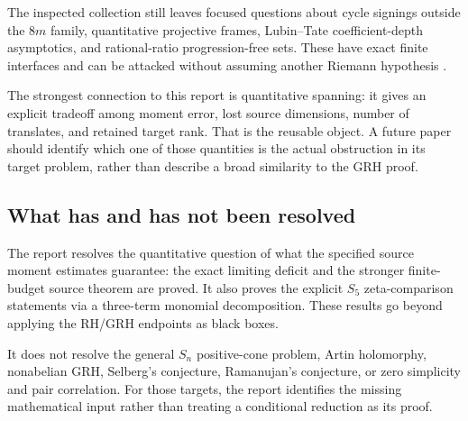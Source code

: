 The inspected collection still leaves focused questions about cycle
signings outside the $8m$ family, quantitative projective frames,
Lubin--Tate coefficient-depth asymptotics, and rational-ratio
progression-free sets. These have exact finite interfaces and can be
attacked without assuming another Riemann hypothesis
\cite{prioradvance,priorideal,priormcnew}.

The strongest connection to this report is quantitative spanning:
it gives an explicit tradeoff among moment error, lost source dimensions,
number of translates, and retained target rank. That is the reusable
object. A future paper should identify which one of those quantities is
the actual obstruction in its target problem, rather than describe a
broad similarity to the GRH proof.

\subsection{What has and has not been resolved}

The report resolves the quantitative question of what the specified
source moment estimates guarantee: the exact limiting deficit and the
stronger finite-budget source theorem are proved. It also proves the
explicit $S_5$ zeta-comparison statements via a three-term monomial
decomposition. These results go beyond applying the RH/GRH endpoints as
black boxes.

It does not resolve the general $S_n$ positive-cone problem, Artin
holomorphy, nonabelian GRH, Selberg's conjecture, Ramanujan's conjecture,
or zero simplicity and pair correlation. For those targets, the report
identifies the missing mathematical input rather than treating a
conditional reduction as its proof.
